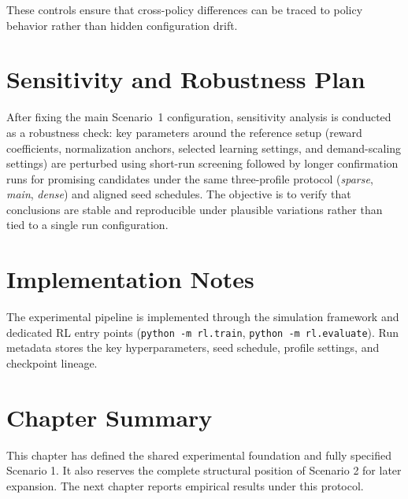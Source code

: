 These controls ensure that cross-policy differences can be traced to policy behavior rather than hidden configuration drift.

\section{Sensitivity and Robustness Plan}

After fixing the main Scenario~1 configuration, sensitivity analysis is conducted as a robustness check: key parameters around the reference setup (reward coefficients, normalization anchors, selected learning settings, and demand-scaling settings) are perturbed using short-run screening followed by longer confirmation runs for promising candidates under the same three-profile protocol (\textit{sparse}, \textit{main}, \textit{dense}) and aligned seed schedules. The objective is to verify that conclusions are stable and reproducible under plausible variations rather than tied to a single run configuration.

\section{Implementation Notes}

The experimental pipeline is implemented through the simulation framework and dedicated RL entry points (\texttt{python -m rl.train}, \texttt{python -m rl.evaluate}). Run metadata stores the key hyperparameters, seed schedule, profile settings, and checkpoint lineage.

\section{Chapter Summary}

This chapter has defined the shared experimental foundation and fully specified Scenario 1. It also reserves the complete structural position of Scenario 2 for later expansion. The next chapter reports empirical results under this protocol.
